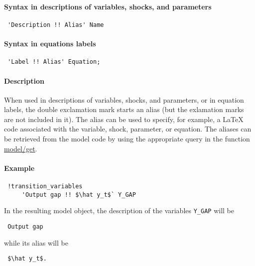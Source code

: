 


	\paragraph{Syntax in descriptions of variables, shocks, and parameters}
 
 \begin{verbatim}
 'Description !! Alias' Name
 \end{verbatim}
 
 \paragraph{Syntax in equations labels}
 
 \begin{verbatim}
 'Label !! Alias' Equation;
 \end{verbatim}
 
 \paragraph{Description}
 
 When used in descriptions of variables, shocks, and parameters, or in
 equation labels, the double exclamation mark starts an alias (but the
 exlamation marks are not included in it). The alias can be used to
 specify, for example, a LaTeX code associated with the variable, shock,
 parameter, or equation. The aliases can be retrieved from the model code
 by using the appropriate query in the function \url{model/get}.
 
 \paragraph{Example}
 
 \begin{verbatim}
 !transition_variables
     'Output gap !! $\hat y_t$` Y_GAP
 \end{verbatim}
 
 In the resulting model object, the description of the variables
 \texttt{Y\_GAP} will be
 
 \begin{verbatim}
 Output gap
 \end{verbatim}
 
 while its alias will be
 
 \begin{verbatim}
 $\hat y_t$.
 \end{verbatim}


